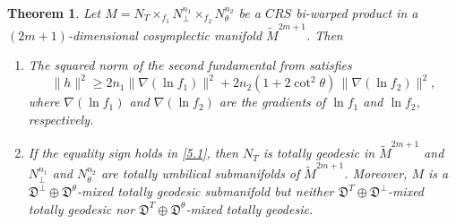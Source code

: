 \documentclass[reqno]{amsart}
\theoremstyle{plain}
\newtheorem{theorem}{Theorem}[section]
\theoremstyle{remark}
\numberwithin{equation}{section}
\begin{document}
\begin{theorem}\label{T:5.1} Let $M=N_T\times_{f_1}N^{n_{1}}_\perp\times_{f_2}N^{n_{2}}_\theta$ be a $CRS$ bi-warped product in a $(2m+1)$-dimensional cosymplectic manifold $\widetilde M^{2m+1}$. Then
\begin{enumerate}
\item[(i)] The squared norm of the second fundamental from satisfies 
\begin{equation}\label{5.1}
\|h\|^2\geq 2n_1\|\nabla(\ln f_1)\|^2+2n_2(1+2\cot^2\theta)\,\|\nabla(\ln f_2)\|^2, 
\end{equation}
where $\nabla(\ln f_1)$ and $\nabla(\ln f_2)$ are the gradients of $\ln f_{1}$ and $\ln f_{2}$, respectively.
\item[(ii)] If the equality sign holds in \eqref{5.1}, then $N_T$ is totally geodesic in $\widetilde M^{2m+1}$ and $N^{n_{1}}_\perp$ and $N^{n_{2}}_\theta$ are totally umbilical submanifolds of $\widetilde M^{2m+1}$. Moreover, $M$ is a ${\mathfrak{D}}^\perp\oplus{\mathfrak{D}}^\theta$-mixed totally geodesic submanifold but neither ${\mathfrak{D}^{T}}\oplus {\mathfrak{D}}^\perp$-mixed totally geodesic nor ${\mathfrak{D}^{T}}\oplus {\mathfrak{D}}^\theta$-mixed totally geodesic.
\end{enumerate}
\end{theorem}
\end{document}
